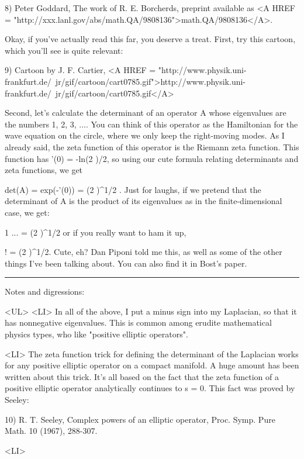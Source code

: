 8) Peter Goddard, The work of R. E. Borcherds, preprint available as
<A HREF = "http://xxx.lanl.gov/abs/math.QA/9808136">math.QA/9808136</A>.

Okay, if you've actually read this far, you deserve a treat.  First, 
try this cartoon, which you'll see is quite relevant:

9) Cartoon by J. F. Cartier, <A HREF = "http://www.physik.uni-frankfurt.de/~jr/gif/cartoon/cart0785.gif">http://www.physik.uni-frankfurt.de/~jr/gif/cartoon/cart0785.gif</A>

Second, let's
calculate the determinant of an operator A whose eigenvalues are the
numbers 1, 2, 3, ....  You can think of this operator as the Hamiltonian
for the wave equation on the circle, where we only keep the right-moving
modes.  As I already said, the zeta function of this operator is the
Riemann zeta function.  This function has \zeta '(0) = -ln(2 \pi )/2, so
using our cute formula relating determinants and zeta functions, we get

                 det(A) = exp(-\zeta '(0)) = (2 \pi )^{1/2} . 
Just for laughs, if we pretend that the determinant of A is the product
of its eigenvalues as in the finite-dimensional case, we get:

                    1   \times  ... = (2 \pi )^{1/2} 
or if you really want to ham it up,

                      \infty ! = (2 \pi )^{1/2}.
Cute, eh?  Dan Piponi told me this, as well as some of the other things
I've been talking about.  You can also find it in Bost's paper.  

\par\noindent\rule{\textwidth}{0.4pt}
Notes and digressions:

<UL>
<LI>
In all of the above, I put a minus sign into my Laplacian, so that it
has nonnegative eigenvalues.  This is common among erudite mathematical
physics types, who like "positive elliptic operators".

<LI>
The zeta function trick for defining the determinant of the Laplacian
works for any positive elliptic operator on a compact manifold.  A huge
amount has been written about this trick.  It's all based on the fact
that the zeta function of a positive elliptic operator analytically 
continues to s = 0.  This fact was proved by Seeley:

10) R. T. Seeley, Complex powers of an elliptic operator, Proc. Symp.
Pure Math. 10 (1967), 288-307.

<LI>

